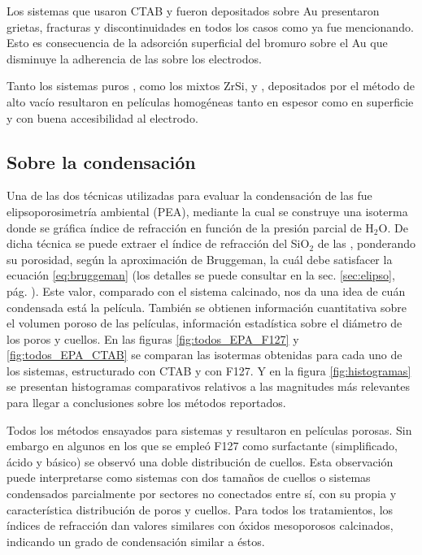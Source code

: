 			Los sistemas que usaron CTAB y fueron depositados sobre Au presentaron grietas, fracturas y discontinuidades en todos los casos como ya fue mencionando. Esto es consecuencia de la adsorción superficial del bromuro sobre el Au que disminuye la adherencia de las \pdm\space sobre los electrodos. 

			Tanto los sistemas puros \pdmF, como los mixtos Zr\textbar Si, \pdmZ\space y \pdmZB, depositados por el método de alto vacío resultaron en películas homogéneas tanto en espesor como en superficie y con buena accesibilidad al electrodo.

	\subsection{Sobre la condensación}

		Una de las dos técnicas utilizadas para evaluar la condensación de las \pdm\space fue elipsoporosimetría ambiental (PEA), mediante la cual se construye una isoterma donde se gráfica índice de refracción en función de la presión parcial de H$_2$O. De dicha técnica se puede extraer el índice de refracción del SiO$_2$ de las \pdm, ponderando su porosidad, según la aproximación de Bruggeman, la cuál debe satisfacer la ecuación \ref{eq:bruggeman} \cite{Bruggeman1935} (los detalles se puede consultar en la sec. \ref{sec:elipso}, pág. \pageref{sec:elipso}). Este valor, comparado con el sistema calcinado, nos da una idea de cuán condensada está la película. También se obtienen información cuantitativa sobre el volumen poroso de las películas, información estadística sobre el diámetro de los poros y cuellos. En las figuras \ref{fig:todos_EPA_F127} y \ref{fig:todos_EPA_CTAB} se comparan las isotermas obtenidas para cada uno de los sistemas, estructurado con CTAB y con F127. Y en la figura \ref{fig:histogramas} se presentan histogramas comparativos relativos a las magnitudes más relevantes para llegar a conclusiones sobre los métodos reportados.

		Todos los métodos ensayados para sistemas \pdmF\space y \pdmC\space resultaron en películas porosas. Sin embargo en algunos en los que se empleó F127 como surfactante (simplificado, ácido y básico) se observó una doble distribución de cuellos. Esta observación puede interpretarse como sistemas con dos tamaños de cuellos o sistemas condensados parcialmente por sectores no conectados entre sí, con su propia y característica distribución de poros y cuellos. Para todos los tratamientos, los índices de refracción dan valores similares con óxidos mesoporosos calcinados, indicando un grado de condensación similar a éstos. 


